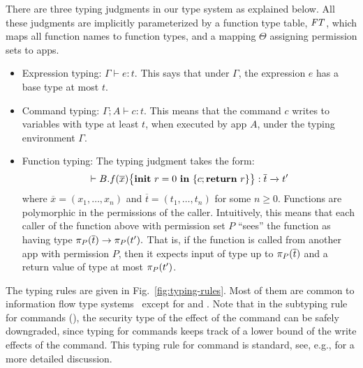 {{{There are three typing judgments in our type system as explained below. All these judgments are implicitly parameterized by
a function type table, $\FT$, which maps all function names to function types, and a mapping $\Theta$ assigning permission sets to apps.

\begin{itemize}
\item Expression typing: $\Gamma \vdash e : t.$
This says that under $\Gamma$,
the expression $e$ has a base type at most $t$.

\item Command typing: $\Gamma; A \vdash c : t$.
This means that the command $c$ writes to variables with type at least $t$, when
executed by app $A$, under the typing environment $\Gamma.$

\item Function typing:
The typing judgment takes the form: $$\vdash \lpFUN{B.f}{\overline{x}}{c} :  \overline{t} \xrightarrow{} t'$$
where $\overline{x} = (x_1,\dots,x_n)$ and
$\overline{t} = (t_1,\dots,t_n)$ for some $n \geq 0.$
Functions are
polymorphic in the permissions of the caller.
Intuitively, this means that each caller of the function above with permission set $P$
``sees'' the function as having type
$\app{\overline{t}}{P} \rightarrow \app{t'}{P}.$
That is, if the function is called from another app with permission $P$,
then it expects input of type up to $\app{\overline{t}}{P}$ and
a return value of type at most $\app{t'}{P}$.

\end{itemize}
The typing rules are given in Fig.~\ref{fig:typing-rules}.
Most of them are common to
information flow type systems~\cite{Volpano:1996,Banerjee:2005ht,Sabelfeld:2003} except for  and . Note that in the subtyping rule for commands (), the security type of the effect of the command
can be safely downgraded, since typing for commands keeps track of a lower bound of the write effects of the command. This typing rule for
command is standard, see, e.g., \cite{Volpano:1996} for a more detailed discussion.

}}}
